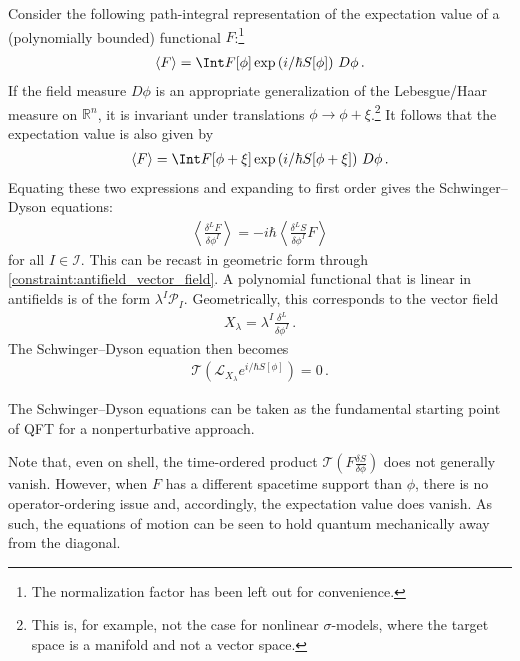     Consider the following path-integral representation of the expectation value of a (polynomially bounded) functional $F$:\footnote{The normalization factor has been left out for convenience.}
    \begin{gather}
        \langle F\rangle = \Int F[\phi]\exp\left(i/\hbar S[\phi]\right)\,D\phi\,.
    \end{gather}
    If the field measure $D\phi$ is an appropriate generalization of the Lebesgue/Haar measure on $\mathbb{R}^n$, it is invariant under translations $\phi\longrightarrow\phi+\xi$.\footnote{This is, for example, not the case for nonlinear $\sigma$-models, where the target space is a manifold and not a vector space.} It follows that the expectation value is also given by
    \begin{gather}
        \langle F\rangle = \Int F[\phi+\xi]\exp\left(i/\hbar S[\phi+\xi]\right)\,D\phi\,.
    \end{gather}
    Equating these two expressions and expanding to first order gives the Schwinger--Dyson equations:
    \begin{gather}
        \label{qft:schwinger_dyson_equations}
        \left\langle\frac{\delta^LF}{\delta\phi^I}\right\rangle = -i\hbar\left\langle\frac{\delta^LS}{\delta\phi^I}F\right\rangle
    \end{gather}
    for all $I\in\mathcal{I}$. This can be recast in geometric form through \cref{constraint:antifield_vector_field}. A polynomial functional that is linear in antifields is of the form $\lambda^I\mathcal{P}_I$. Geometrically, this corresponds to the vector field
    \begin{gather}
        X_\lambda = \lambda^I\frac{\delta^L}{\delta\phi^I}\,.
    \end{gather}
    The Schwinger--Dyson equation then becomes
    \begin{gather}
        \mathcal{T}\left(\mathcal{L}_{X_\lambda}e^{i/\hbar S[\phi]}\right)=0\,.
    \end{gather}
    
    \begin{remark}
        The Schwinger--Dyson equations can be taken as the fundamental starting point of QFT for a nonperturbative approach.
    \end{remark}

    Note that, even on shell, the time-ordered product $\mathcal{T}\left(F\frac{\delta S}{\delta\phi}\right)$ does not generally vanish. However, when $F$ has a different spacetime support than $\phi$, there is no operator-ordering issue and, accordingly, the expectation value does vanish. As such, the equations of motion can be seen to hold quantum mechanically away from the diagonal.

